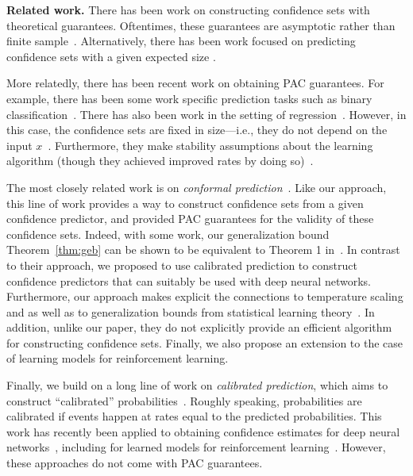 \documentclass{article} \usepackage{iclr2020_conference,times}
\renewcommand{\(}						{\left(}
\renewcommand{\)}						{\right)}
\renewcommand{\[}						{\left[}
\renewcommand{\]}						{\right]}
\newcommand{\<}						{\left<}
\renewcommand{\>}						{\right>}
\begin{document}
\textbf{Related work.}
There has been work on constructing confidence sets with theoretical guarantees. Oftentimes, these guarantees are asymptotic rather than finite sample~\citep{steinberger2016leave,steinberger2018conditional}. Alternatively, there has been work focused on predicting confidence sets with a given expected size \citep{denis2017confidence}. 

More relatedly, there has been recent work on obtaining PAC guarantees. For example, there has been some work specific prediction tasks such as binary classification~\citep{lei2014classification,wang2018learning}. There has also been work in the setting of regression~\citep{lei2018distribution,barber2019predictive}. However, in this case, the confidence sets are fixed in size---i.e., they do not depend on the input $x$~\citep{barber2019predictive}. Furthermore, they make stability assumptions about the learning algorithm (though they achieved improved rates by doing so)~\citep{lei2018distribution,barber2019predictive}.

The most closely related work is on \emph{conformal prediction}~\citep{papadopoulos2008inductive,vovk2013conditional}. Like our approach, this line of work provides a way to construct confidence sets from a given confidence predictor, and provided PAC guarantees for the validity of these confidence sets. Indeed, with some work, our generalization bound Theorem~\ref{thm:geb} can be shown to be equivalent to Theorem 1 in~\cite{vovk2013conditional}. In contrast to their approach, we proposed to use calibrated prediction to construct confidence predictors that can suitably be used with deep neural networks. Furthermore, our approach makes explicit the connections to temperature scaling and as well as to generalization bounds from statistical learning theory~\citep{vapnik1999overview}. In addition, unlike our paper, they do not explicitly provide an efficient algorithm for constructing confidence sets. Finally, we also propose an extension to the case of learning models for reinforcement learning.

Finally, we build on a long line of work on \emph{calibrated prediction}, which aims to construct ``calibrated'' probabilities~\citep{murphy1972scalar,degroot1983comparison,platt1999probabilistic,zadrozny2001obtaining,zadrozny2002transforming,naeini2015obtaining,kuleshov2015calibrated}. Roughly speaking, probabilities are calibrated if events happen at rates equal to the predicted probabilities. This work has recently been applied to obtaining confidence estimates for deep neural networks~\citep{guo2017calibration,kuleshov2018accurate,pearce2018high}, including for learned models for reinforcement learning~\citep{malik2019calibrated}. However, these approaches do not come with PAC guarantees.
\end{document}
